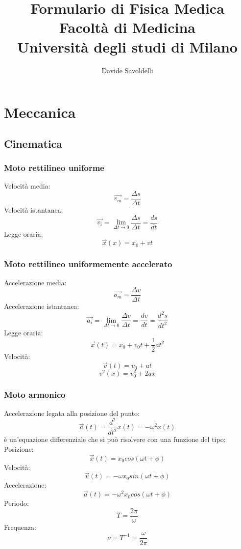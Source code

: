 \documentclass[12pt]{article}
\begin{document}
\title{%
  Formulario di Fisica Medica \\
  \large Facoltà di Medicina \\
  Università degli studi di Milano \\
}

\author{Davide Savoldelli}

\maketitle
\tableofcontents

\newpage
\section{Meccanica}
    \subsection{Cinematica}
        \subsubsection{Moto rettilineo uniforme}
            Velocità media: \[\vec{v_m} = \frac{\Delta s}{\Delta t}\]
            Velocità istantanea: \[\vec{v_i} = \lim_{\Delta t \to 0}{\frac{\Delta s}{\Delta t} = \frac{ds}{dt}}\]
            Legge oraria: \[\vec{x}(x) = x_0 + vt\]
        \subsubsection{Moto rettilineo uniformemente accelerato}
            Accelerazione media: \[\vec{a_m} = \frac{\Delta v}{\Delta t}\]
            Accelerazione istantanea: \[\vec{a_i} = \lim_{\Delta t \to 0}{\frac{\Delta v}{\Delta t} = \frac{dv}{dt}} = \frac{d^2s}{dt^2}\]
            Legge oraria: \[\vec{x}(t) = x_0 + v_0t + \frac{1}{2}at^2\]
            Velocità: \[\vec{v}(t) = v_0 + at\]
            \[v^2(x) = v_0^2 + 2ax \]
        \subsubsection{Moto armonico}
            Accelerazione legata alla posizione del punto:
            \[\vec{a}(t) = \frac{d^2}{dt^2}x(t) = -\omega^2x(t) \] 
            è un'equazione differenziale che si può risolvere con una funzione del tipo:
            Posizione: \[\vec{x}(t) = x_0 cos(\omega t + \phi)\]
            Velocità: \[\vec{v}(t) = -\omega x_0 sin(\omega t + \phi)\]
            Accelerazione: \[\vec{a}(t) = -\omega^2 x_0 cos(\omega t + \phi)\]
            Periodo: \[T = \frac{2\pi}{\omega}\]
            Frequenza: \[\nu = T^{-1} = \frac{\omega}{2\pi}\]
\end{document}
